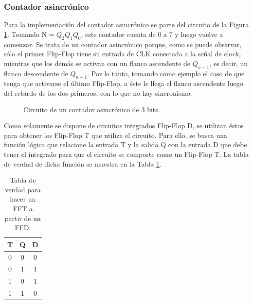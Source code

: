 \subsubsection{Contador asincr\'onico}
\label{ej7_sec:cont_asinc}
\noindent
Para la implementaci\'on del contador asincr\'onico se parte del circuito de la Figura 	\ref{ej7_fig:asinc_init}. Tomando N = $Q_2 Q_1 Q_0$, este contador cuenta de 0 a 7 y luego vuelve a comenzar. Se trata de un contador
asincr\'onico porque, como se puede observar, s\'olo el primer Flip-Flop tiene su entrada de CLK conectada a la señal de clock, mientras que los dem\'as se activan con un flanco ascendente de $\overline{Q_{n-1}}$, es decir, un flanco descendente de $Q_{n-1}$. Por lo tanto, tomando como ejemplo el caso de que tenga que activarse el \'ultimo Flip-Flop, a \'este le llega el flanco ascendente luego del retardo de los dos primeros, con lo que no hay sincronismo. \\
%
\begin{figure}[H]
	\centering
	\caption{Circuito de un contador asincr\'onico de 3 bits.}
	\label{ej7_fig:asinc_init}
\end{figure}
%
\noindent
Como solamente se dispone de circuitos integrados Flip-Flop D, se utilizan \'estos para obtener los Flip-Flop T que utiliza el circuito. Para ello, se busca una funci\'on l\'ogica que relacione la entrada T y la salida Q con la entrada D que debe tener el integrado para que el circuito se comporte como un Flip-Flop T. La tabla de verdad de dicha funci\'on se muestra en la Tabla \ref{ej7_tab:FFDaFFT}.
%
\begin{table}[H]
\centering
\begin{tabular}{|c|c|c|}
\hline
\textbf{T} & \textbf{Q} & \textbf{D} \\ \hline
0          & 0          & 0          \\ \hline
0          & 1          & 1          \\ \hline
1          & 0          & 1          \\ \hline
1          & 1          & 0          \\ \hline
\end{tabular}
\caption{Tabla de verdad para hacer un FFT a partir de un FFD.}
\label{ej7_tab:FFDaFFT}
\end{table}
